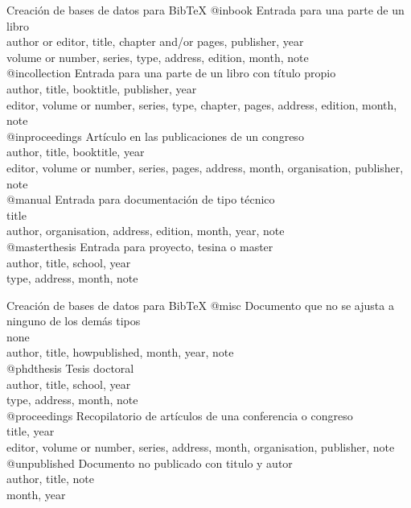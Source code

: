\documentclass[9pt]{beamer}
\begin{document}
\begin{frame}{Creación de bases de datos para BibTeX}	
@inbook Entrada para una parte de un libro\\
	author or editor, title, chapter and/or pages, publisher, year\\
	volume or number, series, type, address, edition, month, note\\
@incollection Entrada para una parte de un libro con título propio\\
	author, title, booktitle, publisher, year\\
	editor, volume or number, series, type, chapter, pages, address, edition, month, note\\
@inproceedings Artículo en las publicaciones de un congreso\\
	author, title, booktitle, year\\
	editor, volume or number, series, pages, address, month, organisation, publisher, note\\
@manual Entrada para documentación de tipo técnico\\
	title\\
	author, organisation, address, edition, month, year, note\\
@masterthesis Entrada para proyecto, tesina o master\\
	author, title, school, year\\
	type, address, month, note\\
	\end{frame}
	
\begin{frame}{Creación de bases de datos para BibTeX}
@misc Documento que no se ajusta a ninguno de los demás tipos\\
	none\\
	author, title, howpublished, month, year, note\\
@phdthesis Tesis doctoral\\
	author, title, school, year\\
	type, address, month, note\\
@proceedings Recopilatorio de artículos de una conferencia o congreso\\
	title, year\\
	editor, volume or number, series, address, month, organisation, publisher, note\\
@unpublished Documento no publicado con titulo y autor\\
	author, title, note\\
	month, year\\
	
\end{frame}
\end{document}
